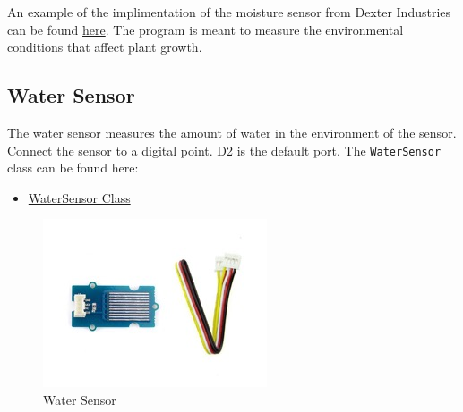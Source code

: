 An example of the implimentation of the moisture sensor from Dexter
Industries can be found
\href{https://github.com/DexterInd/GrovePi/blob/master/Projects/plant_monitor/plant_project.py}{here}.
The program is meant to measure the environmental conditions that affect
plant growth.

\subsection{Water Sensor}\label{water-sensor}

The water sensor measures the amount of water in the environment of the
sensor. Connect the sensor to a digital point. D2 is the default port.
The \texttt{WaterSensor} class can be found here:

\begin{itemize}
\tightlist
\item
  \href{https://github.com/cloudmesh/cloudmesh.pi/blob/master/cloudmesh/pi/water.py}{WaterSensor
  Class}
\end{itemize}

\begin{figure}
\centering
\includegraphics{../images/grovepi/water.jpg}
\caption{Water Sensor}
\end{figure}
